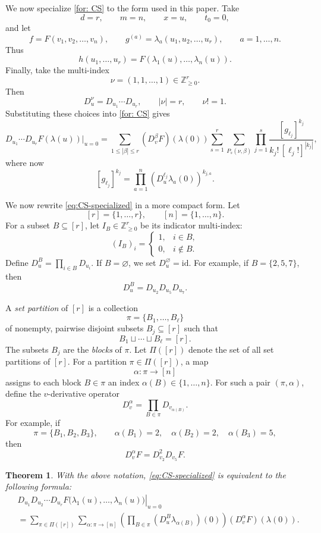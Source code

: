 \documentclass[11pt,reqno]{amsart}
\newtheorem{theorem}{Theorem}[section]
\theoremstyle{definition}
\newcommand{\bbZ}{\mathbb{Z}}
\newcommand{\id}{\mathrm{id}}
\begin{document}
We now specialize \eqref{for: CS} to the form used in this paper.  Take
\[
	d=r,
	\qquad
	m=n,
	\qquad
	x=u,
	\qquad
	t_0=0,
\]
and let
\[
	f=F(v_1,v_2,\ldots,v_n),
	\qquad
	g^{(a)}=\lambda_a(u_1,u_2,\ldots,u_r),
	\qquad a=1,\ldots,n.
\]
Thus
\[
	h(u_1,\ldots,u_r)=F(\lambda_1(u),\ldots,\lambda_n(u)).
\]
Finally, take the multi-index
\begin{equation}\label{eq:squarefree-nu}
	\nu=(1,1,\ldots,1)\in\bbZ_{\geq 0}^r.
\end{equation}
Then
\[
	D_u^\nu=D_{u_1}\cdots D_{u_r},
	\qquad
	|\nu|=r,
	\qquad
	\nu!=1.
\]
 {Substituting these choices into \eqref{for: CS} gives}
\begin{equation}\label{eq:CS-specialized}
D_{u_1}\cdots D_{u_r}F(\lambda(u))\big|_{u=0}
=
\sum_{1\leq |\beta|\leq r}
(D_v^\beta F)(\lambda(0))
\sum_{s=1}^{r}
\sum_{P_s(\nu,\beta)}
\prod_{j=1}^s
\frac{[g_{\ell_j}]^{k_j}}{k_j!\,[\ell_j!]^{|k_j|}},
\end{equation}
where now
\[
	[g_{\ell_j}]^{k_j}
	=
	\prod_{a=1}^n
	\left(D_u^{\ell_j}\lambda_a(0)\right)^{k_{j,a}}.
\]

 { {We now rewrite \eqref{eq:CS-specialized} in a more compact form.}}  Let
\[
	[r]=\{1,\dots,r\},
	\qquad
	[n]=\{1,\dots,n\}.
\]
For a subset \(B\subseteq [r]\), let \(I_B\in\bbZ_{\geq 0}^r\) be its
indicator multi-index:
\[
	(I_B)_i=
	\begin{cases}
	1, & i\in B,\\
	0, & i\notin B.
	\end{cases}
\]
Define
\(D_u^B
=
\prod_{i\in B}D_{u_i}\).
If \(B=\varnothing\), we set
\(D_u^\varnothing = \id\).
For example, if \(B=\{2,5,7\}\), then
\[
	D_u^B
	=
	D_{u_2}D_{u_5}D_{u_7}.
\]

A \emph{set partition} of \([r]\) is a collection
\[
	\pi=\{B_1,\dots,B_\ell\}
\]
of nonempty, pairwise disjoint subsets \(B_j\subseteq [r]\) such that
\[
	B_1\sqcup\cdots\sqcup B_\ell=[r].
\]
The subsets \(B_j\) are the \emph{blocks} of \(\pi\).  
Let
$\Pi([r])$
denote the set of all set partitions of \([r]\).
For a partition \(\pi\in\Pi([r])\), a map
\[
	\alpha:\pi\to[n]
\]
assigns to each block \(B\in\pi\) an index
\(\alpha(B)\in\{1,\dots,n\}\).
For such a pair
\((\pi,\alpha)\), define the \(v\)-derivative operator
\[
	D_v^\alpha
	=
	\prod_{B\in\pi}D_{v_{\alpha(B)}}.
\]
For example, if
\[
	\pi=\{B_1,B_2,B_3\},
	\qquad
	\alpha(B_1)=2,
	\quad
	\alpha(B_2)=2,
	\quad
	\alpha(B_3)=5,
\]
then
\[
	D_v^\alpha F
	=
	D_{v_2}^2D_{v_5}F.
\]

\begin{theorem}\label{thm: FDB}
With the above notation, \eqref{eq:CS-specialized} is equivalent to the
following formula:
\begin{equation}\label{Brunosformula}
\begin{aligned}
&\left.
D_{u_1}D_{u_2}\cdots D_{u_r}
F\bigl(\lambda_1(u),\dots,\lambda_n(u)\bigr)
\right|_{u=0}\\
&=
{
\sum_{\pi\in\Pi([r])}
\sum_{\alpha:\pi\to[n]}
\left(
	\prod_{B\in\pi}
	\left(D_u^B\lambda_{\alpha(B)}\right)(0)
\right)
(D_v^\alpha F)(\lambda(0)).
}
\end{aligned}
\end{equation}
\end{theorem}
\end{document}
